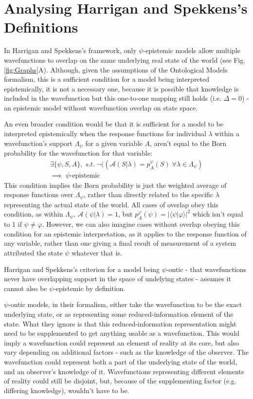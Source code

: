 \documentclass[superscriptaddress, floatfix,nofootinbib,12pt]{revtex4-2}
\newcommand{\braket}[2]{\langle #1|#2 \rangle}
\begin{document}
\section{Analysing Harrigan and Spekkens's Definitions}

In Harrigan and Spekkens's framework, only $\psi$-epistemic models allow multiple wavefunctions to overlap on the same underlying real state of the world (see Fig. \ref{fig:Graphs}A). Although, given the assumptions of the Ontological Models formalism, this is a sufficient condition for a model being interpreted epistemically, it is not a necessary one, because it is possible that knowledge is included in the wavefunction but this one-to-one mapping still holds (i.e. $\Delta=0$) - an epistemic model without wavefunction overlap on state space.

An even broader condition would be that it is sufficient for a model to be interpreted epistemically when the response functions for individual $\lambda$ within a wavefunction's support $\Lambda_\psi$ for a given variable $A$, aren't equal to the Born probability for the wavefunction for that variable:
\begin{equation}
\begin{split}
  \exists\{\psi,S,A\},\;s.t.\;\neg((\mathcal{A}(S\vert\lambda)=p^\psi_A(S)\;\forall\lambda\in\Lambda_{\psi})\\
  \implies\;\psi\text{-epistemic}
  \end{split}
\end{equation}
This condition implies the Born probability is just the weighted average of response functions over $\Lambda_\psi$, rather than directly related to the specific $\lambda$ representing the actual state of the world. All cases of overlap obey this condition, as within $\Lambda_\psi$, $\mathcal{A}(\psi\vert\lambda)=1$, but $p^\varphi_A(\psi)=\vert\braket{\psi}{\varphi}\vert^2$ which isn't equal to 1 if $\psi\neq\varphi$. However, we can also imagine cases without overlap obeying this condition for an epistemic interpretation, as it applies to the response function of any variable, rather than one giving a final result of measurement of a system attributed the state $\psi$ whatever that is.

Harrigan and Spekkens's criterion for a model being $\psi$-ontic - that wavefunctions never have overlapping support in the space of undelying states - assumes it cannot also be $\psi$-epistemic by definition.

$\psi$-ontic models, in their formalism, either take the wavefunction to be the exact underlying state, or as representing some reduced-information element of the state. What they ignore is that this reduced-information representation might need to be supplemented to get anything usable as a wavefunction. This would imply a wavefunction could represent an element of reality at its core, but also vary depending on additional factors - such as the knowledge of the observer. The wavefunction could represent both a part of the underlying state of the world, and an observer's knowledge of it. Wavefunctions representing different elements of reality could still be disjoint, but, because of the supplementing factor (e.g. differing knowledge), wouldn't have to be.
\end{document}
